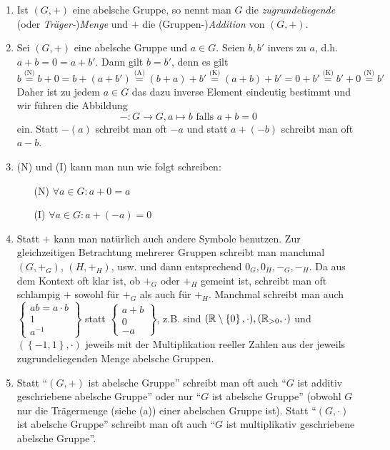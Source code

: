 \documentclass[../../main.tex]{subfiles}
\begin{document}
\begin{bem}\label{2.1.2}
\begin{enumerate}[\normalfont(a)]
\item Ist $(G,+)$ eine abelsche Gruppe, so nennt man $G$ die \emph{zugrundeliegende} (oder \emph{Träger-})\emph{Menge} und $+$ die (Gruppen-)\emph{Addition} von $(G,+)$.
\item Sei $(G,+)$ eine abelsche Gruppe und $a\in G$. Seien $b,b'$ invers zu $a$, d.h. $a+b=0=a+b'$. Dann gilt $b=b'$, denn es gilt
$$b\overset{\text{(N)}} = b+0 = b+(a+b') \overset{\text{(A)}} = (b+a)+b' \overset{\text{(K)}} = (a+b)+b' = 0+b' \overset{\text{(K)}}= b'+0 \overset{\text{(N)}}= b'$$
Daher ist zu jedem $a\in G$ das dazu inverse Element eindeutig bestimmt und wir führen die Abbildung
\[-:G\rightarrow G, a\mapsto b\text{ falls }a+b=0\]
ein. Statt $-(a)$ schreibt man oft $-a$ und statt $a+(-b)$ schreibt man oft $a-b$.
\item (N) und (I) kann man nun wie folgt schreiben:
\begin{itemize}
\item[(N)] $\forall a\in G:a+0=a$
\item[(I)] $\forall a\in G:a+(-a)=0$
\end{itemize}
\item Statt $+$ kann man natürlich auch andere Symbole benutzen. Zur gleichzeitigen Betrachtung mehrerer Gruppen schreibt man manchmal $(G,+_G)$, $(H,+_H)$, usw. und dann entsprechend $0_G, 0_H, -_G, -_H$. Da aus dem Kontext oft klar ist, ob $+_G$ oder $+_H$ gemeint ist, schreibt man oft schlampig $+$ sowohl für $+_G$ als auch für $+_H$. Manchmal schreibt man auch $\begin{Bmatrix}ab=a\cdot b\\1\\a^{-1}\end{Bmatrix}$ statt $\begin{Bmatrix}a+b\\0 \\ -a \end{Bmatrix}$, z.B. sind $(\mathbb R\setminus \left\{0\right\},\cdot), (\mathbb R_{>0},\cdot)$ und $(\left\{-1,1\right\},\cdot)$ jeweils mit der Multiplikation reeller Zahlen aus der jeweils zugrundeliegenden Menge abelsche Gruppen.
\item Statt "`$(G,+)$ ist abelsche Gruppe"' schreibt man oft auch "`$G$ ist additiv geschriebene abelsche Gruppe"' oder nur "`$G$ ist abelsche Gruppe"' (obwohl $G$ nur die Trägermenge (siehe (a)) einer abelschen Gruppe ist). Statt "`$(G,\cdot)$ ist abelsche Gruppe"' schreibt man oft auch "`$G$ ist multiplikativ geschriebene abelsche Gruppe"'.
\end{enumerate}
\end{bem}
\end{document}

